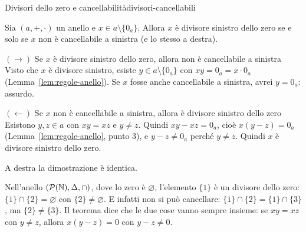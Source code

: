 \begin{concetto}
\begin{Teorema}{Divisori dello zero e cancellabilità}{divisori-cancellabili}
    \begin{prerequisiti}
    \end{prerequisiti}
    Sia $(a, +, \cdot)$ un anello e $x \in a \setminus \{0_a\}$. Allora $x$ è divisore sinistro dello zero se e solo se $x$ non è
    cancellabile a sinistra (e lo stesso a destra).
\end{Teorema}
\begin{dimostrazione}
    \begin{caso}{$(\rightarrow)$ Se $x$ è divisore sinistro dello zero, allora non è cancellabile a sinistra}
        Visto che $x$ è divisore sinistro, esiste $y \in a \setminus \{0_a\}$ con $xy = 0_a = x \cdot 0_a$ (Lemma~\ref{lem:regole-anello}).
        Se $x$ fosse anche cancellabile a sinistra, avrei $y = 0_a$: assurdo.
    \end{caso}
    \begin{caso}{$(\leftarrow)$ Se $x$ non è cancellabile a sinistra, allora è divisore sinistro dello zero}
        Esistono $y, z \in a$ con $xy = xz$ e $y \neq z$. Quindi $xy - xz = 0_a$, cioè $x(y - z) = 0_a$ (Lemma~\ref{lem:regole-anello}, punto 3),
        e $y - z \neq 0_a$ perché $y \neq z$. Quindi $x$ è divisore sinistro dello zero.
    \end{caso}
    A destra la dimostrazione è identica.
\end{dimostrazione}
\end{concetto}

\begin{spiegazione}
    Nell'anello $(\mathcal{P}(\mathbb{N}), \Delta, \cap)$, dove lo zero è $\varnothing$, l'elemento $\{1\}$ è un divisore dello zero: $\{1\} \cap \{2\} = \varnothing$ con $\{2\} \neq \varnothing$. E infatti non si
    può cancellare: $\{1\} \cap \{2\} = \{1\} \cap \{3\}$, ma $\{2\} \neq \{3\}$. Il teorema dice che le due cose vanno sempre insieme: se $xy = xz$ con $y \neq z$, allora $x(y - z) = 0$
    con $y - z \neq 0$.
\end{spiegazione}


